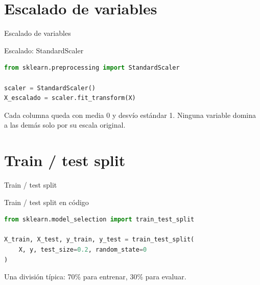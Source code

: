 \section{Escalado de variables}

\begin{frame}{Escalado de variables}
  \pause
\end{frame}

\begin{frame}[fragile]{Escalado: StandardScaler}
  \begin{lstlisting}[language=Python]
from sklearn.preprocessing import StandardScaler

scaler = StandardScaler()
X_escalado = scaler.fit_transform(X)
  \end{lstlisting}
  Cada columna queda con media 0 y desvío estándar 1. Ninguna variable
  domina a las demás solo por su escala original.
\end{frame}

\section{Train / test split}

\begin{frame}{Train / test split}
  \pause
\end{frame}

\begin{frame}[fragile]{Train / test split en código}
  \begin{lstlisting}[language=Python]
from sklearn.model_selection import train_test_split

X_train, X_test, y_train, y_test = train_test_split(
    X, y, test_size=0.2, random_state=0
)
  \end{lstlisting}
  Una división típica: 70\% para entrenar, 30\% para evaluar.
\end{frame}


